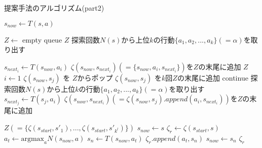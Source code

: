 \begin{algorithm}
    
    \caption{提案手法のアルゴリズム(part2)}
    \label{alg:myalg-2}
    \begin{algorithmic}[1]    
    \scriptsize   
           \State $s_{now} \gets T(s, a)$
           
           \State $Z \gets $ empty queue
             \Return  $Z$
            \EndIf
           \State 探索回数$N(s)$から上位$k$の行動$\{a_1, a_2, ..., a_{k}\}(=\alpha)$を取り出す
             
             \State $s_{{next}_i} \gets T(s_{now}, a_i)$
             \State $\zeta(s_{now},s_{{next}_i})(=\{s_{now}, a_i, s_{{next}_i}\})$を$Z$の末尾に追加
           \EndFor
             \Return $Z$
           \EndIf
           \State $i \gets 1$
                    \State $\zeta(s_{now}, s_{j})$ を $Z$からポップ
                        \State $\zeta(s_{now}, s_{j})$ を$k$回$Z$の末尾に追加
                        \State continue
                    \EndIf
                    \State 探索回数$N(s)$から上位$k$の行動$\{a_1, a_2, ..., a_{k}\}(=\alpha)$を取り出す
                        \State $s_{{next}_j} \gets T(s_{j}, a_i)$
                        \State $\zeta(s_{now},s_{{next}_i})(=\zeta(s_{now}, s_{j}).append({a_i, s_{{next}_i}}))$を$Z$の末尾に追加
                    \EndFor
                    
                \EndFor     
           \EndWhile
           \Return $Z(=\{\zeta(s_{start}, {s'}_1), ..., \zeta(s_{start}, {s'}_{k^l})\})$
        \EndFunction
        \State $s_{now} \gets s$
        \State $\zeta_r \gets \zeta(s_{start}, s)$
            \State $a_t \gets \textrm{argmax}_a N(s_{now}, a)$
            \State $s_n \gets T(s_{now}, a_t)$
            \State $\zeta_r.append({a_t, s_n})$
            \State $s_{now} \gets s_n$
        \EndWhile
        \Return $\zeta_r$
        \EndFunction
       
        
    \end{algorithmic}
\end{algorithm}

